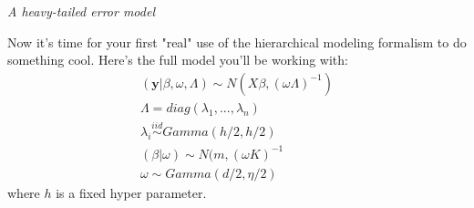 \documentclass{homework}
\begin{document}
\textit{A heavy-tailed error model} \\
\par Now it's time for your first "real" use of the hierarchical modeling formalism to do something cool. Here's the full model you'll be working with:
\begin{equation} \begin{split}
(\textbf{y}  |  \beta, \omega, \Lambda) \sim N(X\beta, (\omega \Lambda)^{-1})\\
\Lambda = diag(\lambda_1, . . . , \lambda_n) \\
\lambda_i \stackrel{iid}{\sim} Gamma(h/2, h/2) \\
( \beta | \omega ) \sim N(m, (\omega K)^{-1} \\
\omega \sim Gamma(d/2, \eta/2 )
\end{split}\end{equation}
where $h$ is a fixed hyper parameter. \\
\end{document}
